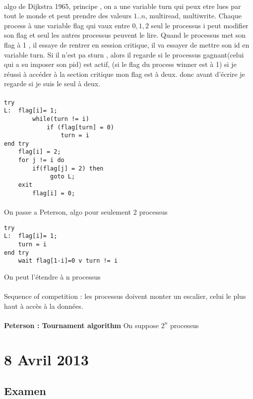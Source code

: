 \documentclass{article}
\begin{document}
\paragraph{} algo de Dijkstra 1965, principe , on a une variable turn qui peux etre lues par tout le monde et peut prendre des valeurs $ 1..n$, multiread, multiwrite. Chaque process à une variable flag qui vaux entre $0,1,2$ seul le processus i peut modifier son flag et seul les autres processus peuvent le lire. Quand le processus met son flag à 1 , il essaye de rentrer en session critique, il va essayer de mettre son id en variable turn. Si il n'est pa sturn , alors il regarde si le processus gagnant(celui qui a su imposer son pid) est actif, (si le flag du process winner est à  1) si je réussi à accéder à la section critique mon flag est  à deux. donc avant d'écrire je regarde si je suis le seul à deux. 
\paragraph{}
\begin{verbatim}
try 
L:	flag[i]= 1;
		while(turn != i)
			if (flag[turn] = 0)
				turn = i
end try
	flag[i] = 2;
	for j != i do
		if(flag[j] = 2) then
			 goto L;
	exit
		flag[i] = 0;
\end{verbatim}
\paragraph{ } On passe a Peterson, algo pour seulement 2 processus
\begin{verbatim}
try 
L:	flag[i]= 1;
	turn = i
end try
	wait flag[1-i]=0 v turn != i 
\end{verbatim}
On peut l'étendre à n processus
\paragraph{} Sequence of competition : les processus doivent monter un escalier, celui le plus haut à accès à la données.\\\\\textbf{Peterson : Tournament algorithm } On suppose $2^n$ processus

\section{8 Avril 2013}
\subsection{Examen} 
\end{document}
